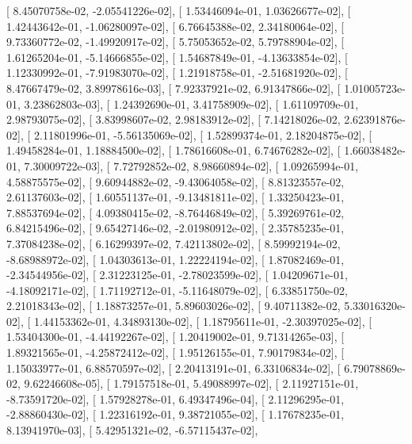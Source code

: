 \documentclass{article}
\begin{document}
       [  8.45070758e-02,  -2.05541226e-02],
       [  1.53446094e-01,   1.03626677e-02],
       [  1.42443642e-01,  -1.06280097e-02],
       [  6.76645388e-02,   2.34180064e-02],
       [  9.73360772e-02,  -1.49920917e-02],
       [  5.75053652e-02,   5.79788904e-02],
       [  1.61265204e-01,  -5.14666855e-02],
       [  1.54687849e-01,  -4.13633854e-02],
       [  1.12330992e-01,  -7.91983070e-02],
       [  1.21918758e-01,  -2.51681920e-02],
       [  8.47667479e-02,   3.89978616e-03],
       [  7.92337921e-02,   6.91347866e-02],
       [  1.01005723e-01,   3.23862803e-03],
       [  1.24392690e-01,   3.41758909e-02],
       [  1.61109709e-01,   2.98793075e-02],
       [  3.83998607e-02,   2.98183912e-02],
       [  7.14218026e-02,   2.62391876e-02],
       [  2.11801996e-01,  -5.56135069e-02],
       [  1.52899374e-01,   2.18204875e-02],
       [  1.49458284e-01,   1.18884500e-02],
       [  1.78616608e-01,   6.74676282e-02],
       [  1.66038482e-01,   7.30009722e-03],
       [  7.72792852e-02,   8.98660894e-02],
       [  1.09265994e-01,   4.58875575e-02],
       [  9.60944882e-02,  -9.43064058e-02],
       [  8.81323557e-02,   2.61137603e-02],
       [  1.60551137e-01,  -9.13481811e-02],
       [  1.33250423e-01,   7.88537694e-02],
       [  4.09380415e-02,  -8.76446849e-02],
       [  5.39269761e-02,   6.84215496e-02],
       [  9.65427146e-02,  -2.01980912e-02],
       [  2.35785235e-01,   7.37084238e-02],
       [  6.16299397e-02,   7.42113802e-02],
       [  8.59992194e-02,  -8.68988972e-02],
       [  1.04303613e-01,   1.22224194e-02],
       [  1.87082469e-01,  -2.34544956e-02],
       [  2.31223125e-01,  -2.78023599e-02],
       [  1.04209671e-01,  -4.18092171e-02],
       [  1.71192712e-01,  -5.11648079e-02],
       [  6.33851750e-02,   2.21018343e-02],
       [  1.18873257e-01,   5.89603026e-02],
       [  9.40711382e-02,   5.33016320e-02],
       [  1.44153362e-01,   4.34893130e-02],
       [  1.18795611e-01,  -2.30397025e-02],
       [  1.53404300e-01,  -4.44192267e-02],
       [  1.20419002e-01,   9.71314265e-03],
       [  1.89321565e-01,  -4.25872412e-02],
       [  1.95126155e-01,   7.90179834e-02],
       [  1.15033977e-01,   6.88570597e-02],
       [  2.20413191e-01,   6.33106834e-02],
       [  6.79078869e-02,   9.62246608e-05],
       [  1.79157518e-01,   5.49088997e-02],
       [  2.11927151e-01,  -8.73591720e-02],
       [  1.57928278e-01,   6.49347496e-04],
       [  2.11296295e-01,  -2.88860430e-02],
       [  1.22316192e-01,   9.38721055e-02],
       [  1.17678235e-01,   8.13941970e-03],
       [  5.42951321e-02,  -6.57115437e-02],
\end{document}
